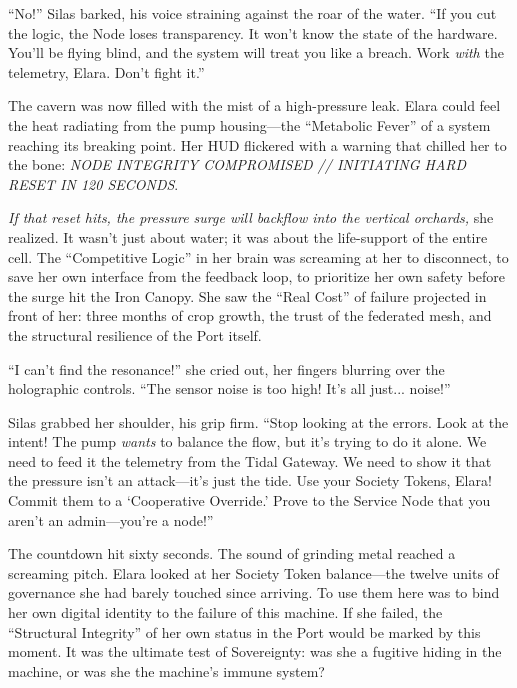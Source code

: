 ``No!'' Silas barked, his voice straining against the roar of the water. ``If you cut the logic, the Node loses transparency. It won't know the state of the hardware. You'll be flying blind, and the system will treat you like a breach. Work \textit{with} the telemetry, Elara. Don't fight it.''


The cavern was now filled with the mist of a high-pressure leak. Elara could feel the heat radiating from the pump housing—the ``Metabolic Fever'' of a system reaching its breaking point. Her HUD flickered with a warning that chilled her to the bone: \textit{NODE INTEGRITY COMPROMISED // INITIATING HARD RESET IN 120 SECONDS}.

\textit{If that reset hits, the pressure surge will backflow into the vertical orchards,} she realized. It wasn't just about water; it was about the life-support of the entire cell. The ``Competitive Logic'' in her brain was screaming at her to disconnect, to save her own interface from the feedback loop, to prioritize her own safety before the surge hit the Iron Canopy. She saw the ``Real Cost'' of failure projected in front of her: three months of crop growth, the trust of the federated mesh, and the structural resilience of the Port itself.

``I can't find the resonance!'' she cried out, her fingers blurring over the holographic controls. ``The sensor noise is too high! It's all just... noise!''

Silas grabbed her shoulder, his grip firm. ``Stop looking at the errors. Look at the intent! The pump \textit{wants} to balance the flow, but it's trying to do it alone. We need to feed it the telemetry from the Tidal Gateway. We need to show it that the pressure isn't an attack—it's just the tide. Use your Society Tokens, Elara! Commit them to a `Cooperative Override.' Prove to the Service Node that you aren't an admin—you're a node!''

The countdown hit sixty seconds. The sound of grinding metal reached a screaming pitch. Elara looked at her Society Token balance—the twelve units of governance she had barely touched since arriving. To use them here was to bind her own digital identity to the failure of this machine. If she failed, the ``Structural Integrity'' of her own status in the Port would be marked by this moment. It was the ultimate test of Sovereignty: was she a fugitive hiding in the machine, or was she the machine's immune system?

